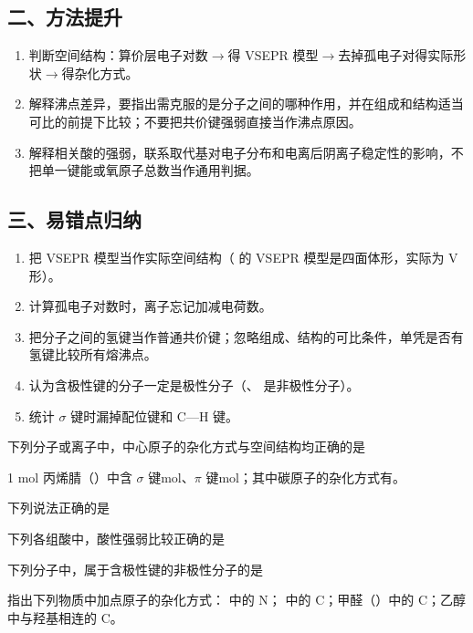 \subsection*{二、方法提升}
\begin{enumerate}
\item 判断空间结构：算价层电子对数$\to$得 VSEPR 模型$\to$去掉孤电子对得实际形状$\to$得杂化方式。
\item 解释沸点差异，要指出需克服的是分子之间的哪种作用，并在组成和结构适当可比的前提下比较；不要把共价键强弱直接当作沸点原因。
\item 解释相关酸的强弱，联系取代基对电子分布和电离后阴离子稳定性的影响，不把单一键能或氧原子总数当作通用判据。
\end{enumerate}
\subsection*{三、易错点归纳}
\begin{enumerate}
\item 把 VSEPR 模型当作实际空间结构（ 的 VSEPR 模型是四面体形，实际为 V 形）。
\item 计算孤电子对数时，离子忘记加减电荷数。
\item 把分子之间的氢键当作普通共价键；忽略组成、结构的可比条件，单凭是否有氢键比较所有熔沸点。
\item 认为含极性键的分子一定是极性分子（、 是非极性分子）。
\item 统计 $\sigma$ 键时漏掉配位键和 C—H 键。
\end{enumerate}

\begin{xiti}[start=1]
\item 下列分子或离子中，中心原子的杂化方式与空间结构均正确的是\xz
{}

\item 1 mol 丙烯腈（）中含 $\sigma$ 键\tk mol、$\pi$ 键\tk mol；其中碳原子的杂化方式有\tk。

\item 下列说法正确的是\xz
{}

\item 下列各组酸中，酸性强弱比较正确的是\xz
{}

\item 下列分子中，属于含极性键的非极性分子的是\xz
{}

\item 指出下列物质中加点原子的杂化方式： 中的 N\tk； 中的 C\tk；甲醛（）中的 C\tk；乙醇中与羟基相连的 C\tk。
\end{xiti}

